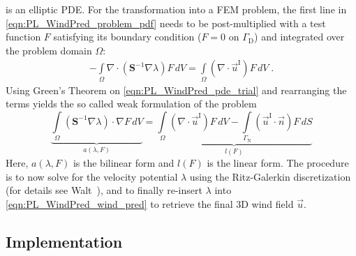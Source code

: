 \documentclass[twocolumn,letterpaper]{IEEEAerospaceCLS}
\def\pazocal#1{{#1}}
\newcommand{\matr}[1]{\bm{#1}}
\begin{document}
 is an elliptic \ac{PDE}. For the transformation into a \ac{FEM} problem, the first line in \cref{eqn:PL_WindPred_problem_pdf} needs to be post-multiplied with a test function $\pazocal{F}$ satisfying its boundary condition ($\pazocal{F} = 0$ on $\Gamma_\text{D}$) and integrated over the problem domain $\Omega$:
	\begin{align}
	- \int\limits_{\Omega} \nabla \cdot \left(\matr{S}^{-1} \nabla \lambda\right) \pazocal{F} \, dV = \int\limits_{\Omega} \left(\nabla \cdot \vec{u}^\text{I} \right) \pazocal{F} \, dV \; .
	\label{eqn:PL_WindPred_pde_trial}
	\end{align}
Using Green's Theorem on \cref{eqn:PL_WindPred_pde_trial} and rearranging the terms yields the so called weak formulation of the problem
\begin{equation}
	\underbrace{\int\limits_{\Omega} \left( \matr{S}^{-1} \nabla \lambda \right) \! \cdot \! \nabla \pazocal{F} \, dV}_{a(\lambda,\pazocal{F})} = \underbrace{\int\limits_{\Omega} \left( \nabla \! \cdot \! \vec{u}^\text{I} \right) \pazocal{F} \, dV - \int\limits_{\Gamma_\text{N}} \left( \vec{u}^\text{I} \! \cdot \! \vec{n} \right) \pazocal{F} \, dS}_{l(\pazocal{F})}
	\label{eqn:PL_WindPred_weak_form}
	\end{equation}
Here, $a(\lambda,\pazocal{F})$ is the bilinear form and $l(\pazocal{F})$ is the linear form. The procedure is to now solve for the velocity potential $\lambda$ using the Ritz-Galerkin discretization (for details see Walt~\cite{Walt2016}), and to finally re-insert $\lambda$ into \cref{eqn:PL_WindPred_wind_pred} to retrieve the final 3D wind field $\vec{u}$.

\subsection{Implementation}
\label{sec:PL_WindPred_Implementation}

\end{document}
